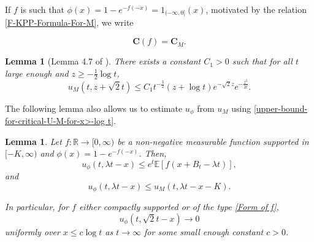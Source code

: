 \documentclass[a4paper,reqno]{amsart}%
\newcommand{\Cb}{\mathbf{C}}
\newcommand{\1}{\mathbf 1}
\theoremstyle{mine}
\numberwithin{theorem}{section}
\newtheorem{lemma}[theorem]{Lemma}
\numberwithin{equation}{section}
\theoremstyle{remark}
\begin{document}
If $f$ is such that $\phi (x) = 1-e^{-f(-x)} =  1_{(-\infty, 0]}(x)$, motivated by the relation \eqref{F-KPP-Formula-For-M}, we write

\begin{equation} \label{rename-C(f)-for-M}
    \Cb(f) = \Cb_M.
\end{equation}
 


\vspace{3mm}


\begin{lemma}[Lemma 4.7 of \cite{ABK13}]\label{Lemma upper and lower of u}
There exists a constant $C_1>0$ such that for all $t$ large enough and  $z\geq -\frac{1}{2} \log t $, 
\begin{equation}\label{upper-bound-for-critical-U-M-for-x>-log t}
u_M(t,z+\sqrt 2t) \le C_1 t^{-\frac{3}{2}}(z+\log t)e^{-\sqrt 2 z} e^{-\frac{z^2}{2t}}. 
\end{equation}
\end{lemma}

    
The following lemma also allows us to estimate $u_\phi$ from $u_M$ using \eqref{upper-bound-for-critical-U-M-for-x>-log t}.

\begin{lemma}\label{when-does-u-go-to-zero}
Let $f:\mathbb{R}\to  [0,\infty)$ be a non-negative measurable function supported in $[-K, \infty)$ and $\phi(x) = 1-e^{-f(-x)}$. Then, 
\begin{equation}\label{upper-bound-for-F-KPP-using-many-to-one}
    u_\phi(t, \lambda t -x) \leq e^t \mathbb{E}[f(x+ B_t - \lambda t)],
\end{equation}
and 
\begin{equation}\label{u-phi-bound-using-u-M}
     u_\phi(t, \lambda t -x) \leq u_M(t, \lambda t -x -K).
\end{equation}


In particular, for $f$ either compactly supported or of the type \eqref{Form of f}, 
\begin{equation}\label{convegence-zero-for-x>-log(t)}
u_\phi(t, \sqrt{2}t - x) \to 0    
\end{equation}
uniformly over $x\leq c\log t $ as $t\to \infty$ for some small enough constant $c>0$. 
\end{lemma}
\end{document}
